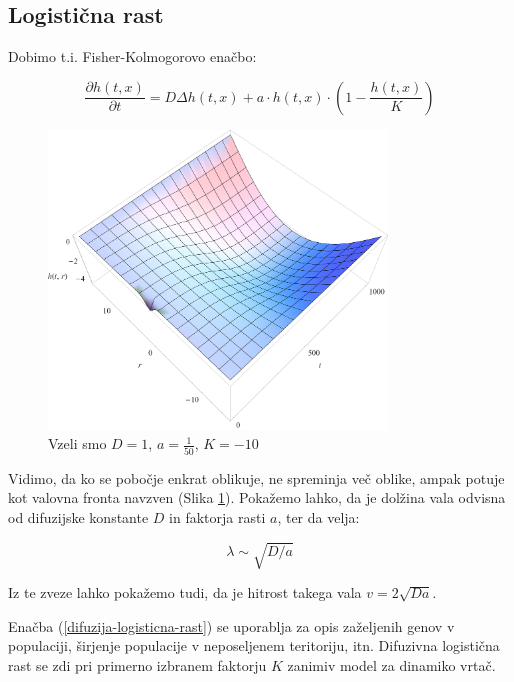 \documentclass[a4paper, twoside, 12pt]{book}
\begin{document}
          \subsection{Logistična rast}

            Dobimo t.i. Fisher-Kolmogorovo enačbo:

            \begin{equation}
              \frac{ \partial h(t,x) }{ \partial t} = D \Delta h(t,x) + a \cdot h(t,x) \cdot (1 - \frac{h(t,x)}{K})
              \label{difuzija-logisticna-rast}
            \end{equation}
            \begin{figure}[h!]
              \begin{center}
                \includegraphics[width=9cm]{slike/difuzija-logisticna-rast2}
              \end{center}
              \caption{Vzeli smo $D=1$, $a=\frac{1}{50}$, $K=-10$}
              \label{fig:difuzija-logisticna-rast}
            \end{figure}

            Vidimo, da ko se pobočje enkrat oblikuje, ne spreminja več oblike, ampak potuje kot valovna fronta navzven (Slika \ref{fig:difuzija-logisticna-rast}). Pokažemo lahko, da je dolžina vala odvisna od difuzijske konstante $D$ in faktorja rasti $a$, ter da velja: 

           \[ \lambda \sim \sqrt{D/a} \]

          Iz te zveze lahko pokažemo tudi, da je hitrost takega vala $v = 2 \sqrt{D a}$.

          Enačba (\ref{difuzija-logisticna-rast}) se uporablja za opis zaželjenih genov v populaciji, širjenje populacije v neposeljenem teritoriju, itn.
          Difuzivna logistična rast se zdi pri primerno izbranem faktorju $K$ zanimiv model za dinamiko vrtač.
\end{document}
